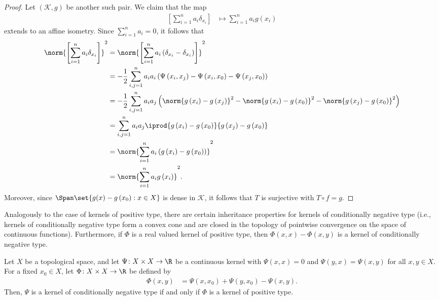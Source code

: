 \documentclass[10pt]{mypackage}
\begin{document}
\begin{proof}
  Let $\left( \mathscr{K},g \right)$ be another such pair. We claim that the map
  \begin{align*}
    \left[ \sum_{i=1}^{n}a_i\delta_{x_i} \right] &\mapsto \sum_{i=1}^{n} a_ig\left( x_i \right)
  \end{align*}
  extends to an affine isometry. Since $\sum_{i=1}^{n}a_i = 0$, it follows that
  \begin{align*}
    \norm{\left[ \sum_{i=1}^{n}a_i\delta_{x_i} \right]}^2 &= \norm{\left[ \sum_{i=1}^{n}a_i\left( \delta_{x_i}-\delta_{x_i} \right) \right]}^2\\
                                                          &= -\frac{1}{2}\sum_{i,j=1}^{n} a_ia_i\left( \Psi\left( x_i,x_j \right)- \Psi\left( x_i,x_0 \right)-\Psi\left( x_j,x_0 \right) \right)\\
                                                          &= -\frac{1}{2}\sum_{i,j=1}^{n} a_ia_j\left( \norm{g\left( x_i \right)-g\left( x_j \right)}^2 - \norm{g\left( x_i \right)-g\left( x_0 \right)}^2 - \norm{g\left( x_j \right)-g\left( x_0 \right)}^2 \right)\\
                                                          &= \sum_{i,j=1}^{n} a_ia_j \iprod{g\left( x_i \right)-g\left( x_0 \right)}{g\left( x_j \right)-g\left( x_0 \right)}\\
                                                          &= \norm{\sum_{i=1}^{n}a_i\left( g\left( x_i \right)-g\left( x_0 \right) \right)}^2\\
                                                          &= \norm{\sum_{i=1}^{n}a_ig\left( x_i \right)}^2.
  \end{align*}
  Moreover, since $\Span\set{g(x)-g\left( x_0 \right) : x\in X}$ is dense in $ \mathscr{K} $, it follows that $T$ is surjective with $T\circ f = g$.
\end{proof}
Analogously to the case of kernels of positive type, there are certain inheritance properties for kernels of conditionally negative type (i.e., kernels of conditionally negative type form a convex cone and are closed in the topology of pointwise convergence on the space of continuous functions). Furthermore, if $\Phi$ is a real valued kernel of positive type, then $\Phi\left( x,x \right)-\Phi\left( x,y \right)$ is a kernel of conditionally negative type.
\begin{lemma}
  Let $X$ be a topological space, and let $\Psi\colon X\times X\to \R$ be a continuous kernel with $\Psi\left( x,x \right) = 0$ and $\Psi\left( y,x \right) = \Psi\left( x,y \right)$ for all $x,y\in X$. For a fixed $x_0\in X$, let $\Phi\colon X\times X\to \R$ be defined by
  \begin{align*}
    \Phi\left( x,y \right) &= \Psi\left( x,x_0 \right) + \Psi\left( y,x_0 \right) - \Psi\left( x,y \right).
  \end{align*}
  Then, $\Psi$ is a kernel of conditionally negative type if and only if $\Phi$ is a kernel of positive type.
\end{lemma}
\end{document}
